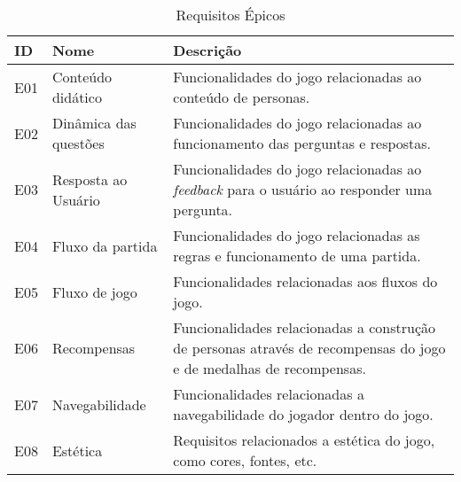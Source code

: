 
\begin{table}[htbp]
    \centering
\caption{\textcolor{textadded}{Requisitos Épicos}}
\label{tab:Table_epicos}
\begin{tabular}{|p{1cm}|p{4.3cm}|p{8.5cm}|}
\hline
\textcolor{textadded}{ID}   & \textcolor{textadded}{Nome}               & \textcolor{textadded}{Descrição}                                                                                                                                                                                                                \\ \hline
\textcolor{textadded}{E01} & \textcolor{textadded}{Conteúdo didático} & \textcolor{textadded}{Funcionalidades do jogo relacionadas ao conteúdo de personas.} \\ \hline

\textcolor{textadded}{E02} & \textcolor{textadded}{Dinâmica das questões}        & \textcolor{textadded}{Funcionalidades do jogo relacionadas ao funcionamento das perguntas e respostas.}  \\ \hline

\textcolor{textadded}{E03} & \textcolor{textadded}{Resposta ao Usuário}       & \textcolor{textadded}{Funcionalidades do jogo relacionadas ao \textit{feedback} para o usuário ao responder uma pergunta.}  \\ \hline   

\textcolor{textadded}{E04} & \textcolor{textadded}{Fluxo da partida}            & \textcolor{textadded}{Funcionalidades do jogo relacionadas as regras e funcionamento de uma partida.} \\ \hline

\textcolor{textadded}{E05} & \textcolor{textadded}{Fluxo de jogo}  & \textcolor{textadded}{Funcionalidades relacionadas aos fluxos do jogo.} \\ \hline

\textcolor{textadded}{E06} & \textcolor{textadded}{Recompensas}  & \textcolor{textadded}{Funcionalidades relacionadas a construção de personas através de recompensas do jogo e de medalhas de recompensas.} \\ \hline

\textcolor{textadded}{E07} & \textcolor{textadded}{Navegabilidade}  & \textcolor{textadded}{Funcionalidades relacionadas a navegabilidade do jogador dentro do jogo.} \\ \hline

\textcolor{textadded}{E08} & \textcolor{textadded}{Estética}  & \textcolor{textadded}{Requisitos relacionados a estética do jogo, como cores, fontes, etc.} \\ \hline

\end{tabular}
\end{table}
